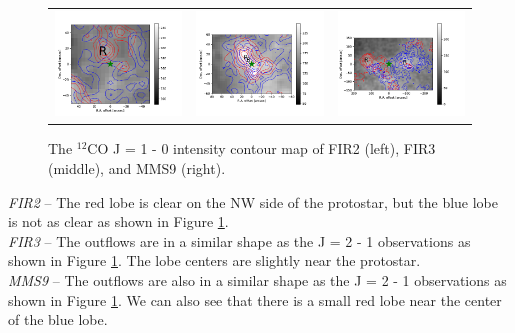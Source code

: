 \begin{figure}[h!]
	\begin{tabular}{ccc}
		\includegraphics[width = 5cm]{Orion_12CO_NRO_HOPS68_rbcontour_400} & 
		\includegraphics[width = 5cm]{Orion_12CO_NRO_HOPS370_rbcontour_400} & 
		\includegraphics[width = 5cm]{Orion_12CO_NRO_HOPS78_rbcontour_400}		
	\end{tabular}
	\caption{The $^{12}$CO J = 1 - 0 intensity contour map of FIR2 (left), FIR3 (middle), and MMS9 (right). }
	\label{fig:12COcontourmap}
\end{figure}

 
\noindent \textit{FIR2} -- The red lobe is clear on the NW side of the protostar, but the blue lobe is not as clear as shown in Figure \ref{fig:12COcontourmap}.\\
\textit{FIR3} -- The outflows are in a similar shape as the J = 2 - 1 observations as shown in Figure \ref{fig:12COcontourmap}. The lobe centers are slightly near the protostar.\\
\textit{MMS9} -- The outflows are also in a similar shape as the J = 2 - 1 observations as shown in Figure \ref{fig:12COcontourmap}. We can also see that there is a small red lobe near the center of the blue lobe.\\
\newpage

